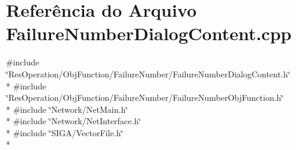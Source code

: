 \section{Referência do Arquivo Failure\+Number\+Dialog\+Content.\+cpp}
\label{_obj_function_2_failure_number_2_failure_number_dialog_content_8cpp}
{\ttfamily \#include \char`\"{}Res\+Operation/\+Obj\+Function/\+Failure\+Number/\+Failure\+Number\+Dialog\+Content.\+h\char`\"{}}\\*
{\ttfamily \#include \char`\"{}Res\+Operation/\+Obj\+Function/\+Failure\+Number/\+Failure\+Number\+Obj\+Function.\+h\char`\"{}}\\*
{\ttfamily \#include \char`\"{}Network/\+Net\+Main.\+h\char`\"{}}\\*
{\ttfamily \#include \char`\"{}Network/\+Net\+Interface.\+h\char`\"{}}\\*
{\ttfamily \#include \char`\"{}S\+I\+G\+A/\+Vector\+File.\+h\char`\"{}}\\*
